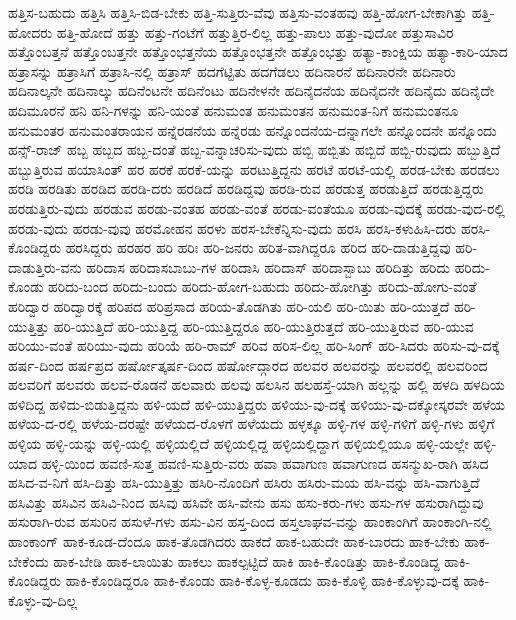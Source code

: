 {ಹತ್ತಿಸ-ಬಹುದು
ಹತ್ತಿಸಿ
ಹತ್ತಿಸಿ-ಬಿಡ-ಬೇಕು
ಹತ್ತಿ-ಸುತ್ತಿರು-ವೆವು
ಹತ್ತಿಸು-ವಂತಹವು
ಹತ್ತಿ-ಹೋಗ-ಬೇಕಾಗಿತ್ತು
ಹತ್ತಿ-ಹೋದರು
ಹತ್ತಿ-ಹೋದೆ
ಹತ್ತು
ಹತ್ತು-ಗಂಟೆಗೆ
ಹತ್ತುತ್ತಿರ-ಲಿಲ್ಲ
ಹತ್ತು-ಪಾಲು
ಹತ್ತು-ವುದೋ
ಹತ್ತುಸಾವಿರ
ಹತ್ತೊಂಬತ್ತನೆ
ಹತ್ತೊಂಬತ್ತನೇ
ಹತ್ತೊಂಭತ್ತನೆಯ
ಹತ್ತೊಂಭತ್ತನೇ
ಹತ್ತೊಂಭತ್ತು
ಹತ್ಯಾ-ಕಾಂಕ್ಷಿಯ
ಹತ್ಯಾ-ಕಾರಿ-ಯಾದ
ಹತ್ರಾಸನ್ನು
ಹತ್ರಾಸಿಗೆ
ಹತ್ರಾಸಿ-ನಲ್ಲಿ
ಹತ್ರಾಸ್
ಹದಗೆಟ್ಟಿತು
ಹದಗೆಡಲು
ಹದಿನಾರನೆ
ಹದಿನಾರನೇ
ಹದಿನಾರು
ಹದಿನಾಲ್ಕನೇ
ಹದಿನಾಲ್ಕು
ಹದಿನೆಂಟನೇ
ಹದಿನೆಂಟು
ಹದಿನೇಳನೇ
ಹದಿನೈದನೆಯ
ಹದಿನೈದನೇ
ಹದಿನೈದು
ಹದಿನೈದೇ
ಹದಿಮೂರನೆ
ಹನಿ
ಹನಿ-ಗಳನ್ನು
ಹನಿ-ಯಂತೆ
ಹನುಮಂತ
ಹನುಮಂತನ
ಹನುಮಂತ-ನಿಗೆ
ಹನುಮಂತನೂ
ಹನುಮಂತರ
ಹನುಮಂತರಾಯನ
ಹನ್ನೆರಡನೆಯ
ಹನ್ನೆರಡು
ಹನ್ನೊಂದನೆಯ-ದನ್ನಾಗಲೇ
ಹನ್ನೊಂದನೇ
ಹನ್ನೊಂದು
ಹನ್ಸ್-ರಾಜ್
ಹಬ್ಬ
ಹಬ್ಬದ
ಹಬ್ಬ-ದಂತೆ
ಹಬ್ಬ-ವನ್ನಾಚರಿಸು-ವುದು
ಹಬ್ಬಿ
ಹಬ್ಬಿತು
ಹಬ್ಬಿದೆ
ಹಬ್ಬಿ-ರುವುದು
ಹಬ್ಬುತ್ತಿದೆ
ಹಬ್ಬುತ್ತಿರುವ
ಹಯಾಸಿಂತ್
ಹರ
ಹರಕೆ
ಹರಕೆ-ಯನ್ನು
ಹರಟುತ್ತಿದ್ದನು
ಹರಟೆ
ಹರಟೆ-ಯಲ್ಲಿ
ಹರಡ-ಬೇಕು
ಹರಡಲು
ಹರಡಿ
ಹರಡಿತು
ಹರಡಿದ
ಹರಡಿ-ದರು
ಹರಡಿದೆ
ಹರಡಿದ್ದವು
ಹರಡಿ-ರುವ
ಹರಡುತ್ತ
ಹರಡುತ್ತಿದೆ
ಹರಡುತ್ತಿದ್ದರು
ಹರಡುತ್ತಿರು-ವುದು
ಹರಡುವ
ಹರಡು-ವಂತಹ
ಹರಡು-ವಂತೆ
ಹರಡು-ವಂತೆಯೂ
ಹರಡು-ವುದಕ್ಕೆ
ಹರಡು-ವುದ-ರಲ್ಲಿ
ಹರಡು-ವುದು
ಹರಡು-ವುವು
ಹರಮೋಹನ
ಹರಳು
ಹರಸ-ಬೇಕೆನ್ನಿಸು-ವುದು
ಹರಸಿ
ಹರಸಿ-ಕಳುಹಿಸಿ-ದರು
ಹರಸಿ-ಕೊಂಡಿದ್ದರು
ಹರಸಿದ್ದರು
ಹರಹರ
ಹರಿ
ಹರಿಃ
ಹರಿ-ಜನರು
ಹರಿತ-ವಾಗಿದ್ದರೂ
ಹರಿದ
ಹರಿ-ದಾಡುತ್ತಿದ್ದವು
ಹರಿ-ದಾಡುತ್ತಿರು-ವನು
ಹರಿದಾಸ
ಹರಿದಾಸಬಾಬು-ಗಳ
ಹರಿದಾಸಿ
ಹರಿದಾಸ್
ಹರಿದಾಸ್ಬಾಬು
ಹರಿದಿತ್ತು
ಹರಿದು
ಹರಿದು-ಕೊಂಡು
ಹರಿದು-ಬಂದ
ಹರಿದು-ಬಂದು
ಹರಿದು-ಹೋಗ-ಬಹುದು
ಹರಿದು-ಹೋಗಿತ್ತು
ಹರಿದು-ಹೋಗು-ವಂತೆ
ಹರಿದ್ವಾರ
ಹರಿದ್ವಾರಕ್ಕೆ
ಹರಿಪದ
ಹರಿಪ್ರಸಾದ
ಹರಿಯ-ತೊಡಗಿತು
ಹರಿ-ಯಲಿ
ಹರಿ-ಯಿತು
ಹರಿ-ಯುತ್ತದೆ
ಹರಿ-ಯುತ್ತಿತ್ತು
ಹರಿ-ಯುತ್ತಿದೆ
ಹರಿ-ಯುತ್ತಿದ್ದ
ಹರಿ-ಯುತ್ತಿದ್ದರೂ
ಹರಿ-ಯುತ್ತಿರುತ್ತದೆ
ಹರಿ-ಯುತ್ತಿರುವ
ಹರಿ-ಯುವ
ಹರಿಯು-ವಂತೆ
ಹರಿಯು-ವುದು
ಹರಿಯೆ
ಹರಿ-ರಾಮ್
ಹರಿವ
ಹರಿಸ-ಲಿಲ್ಲ
ಹರಿ-ಸಿಂಗ್
ಹರಿ-ಸಿದರು
ಹರಿಸು-ವು-ದಕ್ಕೆ
ಹರ್ಷ-ದಿಂದ
ಹರ್ಷಪ್ರದ
ಹರ್ಷೋತ್ಕರ್ಷ-ದಿಂದ
ಹರ್ಷೋದ್ಗಾರದ
ಹಲವರ
ಹಲವರನ್ನು
ಹಲವರಲ್ಲಿ
ಹಲವರಿಂದ
ಹಲವರಿಗೆ
ಹಲವರು
ಹಲವ-ರೊಡನೆ
ಹಲವಾರು
ಹಲವು
ಹಲಸಿನ
ಹಲಹಸ್ತೆ-ಯಾಗಿ
ಹಲ್ಲನ್ನು
ಹಲ್ಲಿ
ಹಳದಿ
ಹಳದಿಯ
ಹಳಿದಿದ್ದ
ಹಳಿದು-ಬಿಡುತ್ತಿದ್ದನು
ಹಳಿ-ಯದೆ
ಹಳಿ-ಯುತ್ತಿದ್ದರು
ಹಳಿಯು-ವು-ದಕ್ಕೆ
ಹಳಿಯು-ವು-ದಕ್ಕೋಸ್ಕರವೇ
ಹಳೆಯ
ಹಳೆಯ-ದ-ರಲ್ಲಿ
ಹಳೆಯ-ದರಷ್ಟೇ
ಹಳೆಯದ-ರೊಳಗೆ
ಹಳೆಯದು
ಹಳ್ಳಕ್ಕೂ
ಹಳ್ಳಿ-ಗಳ
ಹಳ್ಳಿ-ಗಳಿಗೆ
ಹಳ್ಳಿ-ಗಳು
ಹಳ್ಳಿಗೆ
ಹಳ್ಳಿಯ
ಹಳ್ಳಿ-ಯನ್ನು
ಹಳ್ಳಿ-ಯಲ್ಲಿ
ಹಳ್ಳಿಯಲ್ಲಿದೆ
ಹಳ್ಳಿಯಲ್ಲಿದ್ದ
ಹಳ್ಳಿಯಲ್ಲಿದ್ದಾಗ
ಹಳ್ಳಿಯಲ್ಲಿಯೂ
ಹಳ್ಳಿ-ಯಲ್ಲೇ
ಹಳ್ಳಿ-ಯಾದ
ಹಳ್ಳಿ-ಯಿಂದ
ಹವಣಿ-ಸುತ್ತ
ಹವಣಿ-ಸುತ್ತಿರು-ವರು
ಹವಾ
ಹವಾಗುಣ
ಹವಾಗುಣದ
ಹಸನ್ಮುಖ-ರಾಗಿ
ಹಸಿದ
ಹಸಿದ-ವ-ನಿಗೆ
ಹಸಿ-ದಿತ್ತು
ಹಸಿ-ಯುತ್ತಿತ್ತು
ಹಸಿರಿ-ನೊಂದಿಗೆ
ಹಸಿರು
ಹಸಿರು-ಮಯ
ಹಸಿ-ವನ್ನು
ಹಸಿ-ವಾಗುತ್ತಿದೆ
ಹಸಿವಿತ್ತು
ಹಸಿವಿನ
ಹಸಿವಿ-ನಿಂದ
ಹಸಿವು
ಹಸಿವೇ
ಹಸಿ-ವೇನು
ಹಸು
ಹಸು-ಕರು-ಗಳು
ಹಸು-ಗಳ
ಹಸುರಾಗಿದ್ದುವು
ಹಸುರಾಗಿ-ರುವ
ಹಸುರಿನ
ಹಸುಳೆ-ಗಳು
ಹಸು-ವಿನ
ಹಸ್ತ-ದಿಂದ
ಹಸ್ತಲಾಘವ-ವನ್ನು
ಹಾಂಕಾಂಗಿಗೆ
ಹಾಂಕಾಂಗಿ-ನಲ್ಲಿ
ಹಾಂಕಾಂಗ್
ಹಾಕ-ಕೂಡ-ದೆಂದೂ
ಹಾಕ-ತೊಡಗಿದರು
ಹಾಕದೆ
ಹಾಕ-ಬಹುದೇ
ಹಾಕ-ಬಾರದು
ಹಾಕ-ಬೇಕು
ಹಾಕ-ಬೇಕೆಂದು
ಹಾಕ-ಬೇಡಿ
ಹಾಕ-ಲಾಯಿತು
ಹಾಕಲು
ಹಾಕಲ್ಪಟ್ಟಿದೆ
ಹಾಕಿ
ಹಾಕಿ-ಕೊಂಡಿತ್ತು
ಹಾಕಿ-ಕೊಂಡಿದ್ದ
ಹಾಕಿ-ಕೊಂಡಿದ್ದರು
ಹಾಕಿ-ಕೊಂಡಿದ್ದರೂ
ಹಾಕಿ-ಕೊಂಡು
ಹಾಕಿ-ಕೊಳ್ಳ-ಕೂಡದು
ಹಾಕಿ-ಕೊಳ್ಳಿ
ಹಾಕಿ-ಕೊಳ್ಳುವು-ದಕ್ಕೆ
ಹಾಕಿ-ಕೊಳ್ಳು-ವು-ದಿಲ್ಲ
}
